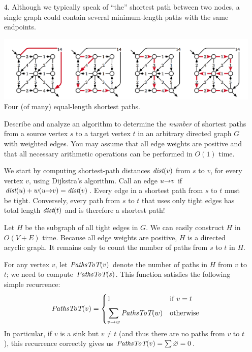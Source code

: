 \documentclass[11pt]{article}
\begin{document}
\begin{enumerate}
\Hard
\item[4.]
Although we typically speak of “the” shortest path between two nodes, a single graph could  contain several minimum-length paths with the same endpoints.  

\begin{center}\footnotesize\sffamily
\includegraphics[scale=0.4]{Fig/three-shortest-paths}\\
Four (of many) equal-length shortest paths.
\end{center}

Describe and analyze an algorithm to determine the \emph{number} of shortest paths from a source vertex $s$ to a target vertex $t$ in an arbitrary directed graph $G$ with weighted edges.  You may assume that all edge weights are positive and that all necessary arithmetic operations can be performed in $O(1)$ time.  



\begin{solution}
We start by computing shortest-path distances $\emph{dist}(v)$ from $s$ to $v$, for every vertex $v$, using Dijkstra’s algorithm.  Call an edge $u\mathord{\rightarrow} v$  if $\emph{dist}(u) + w(u\mathord{\rightarrow} v) = \emph{dist}(v)$.  Every edge in a shortest path from $s$ to $t$ must be tight.  Conversely, every path from $s$ to $t$ that uses only tight edges has total length $\emph{dist}(t)$ and is therefore a shortest path!

Let $H$ be the subgraph of all tight edges in $G$.  We can easily construct $H$ in $O(V+E)$ time.  Because all edge weights are positive, $H$ is a directed acyclic graph.  It remains only to count the number of paths from $s$ to $t$ in $H$.

For any vertex $v$, let $\emph{PathsToT}(v)$ denote the number of paths in $H$ from $v$ to $t$; we need to compute $\emph{PathsToT}(s)$.  This function satisfies the following simple recurrence:
\[
	\emph{PathsToT}(v) = 
	\begin{cases}
		1 & \text{if $v = t$}\\[0.5ex]
		\displaystyle \sum\limits_{v\mathord{\rightarrow} w}^{~} \emph{PathsToT}(w) & \text{otherwise}
	\end{cases}
\]
In particular, if $v$ is a sink but $v\ne t$ (and thus there are no paths from $v$ to $t$), this recurrence correctly gives us $\emph{PathsToT}(v) = \sum\varnothing = 0$.


\end{solution}
\end{enumerate}
\end{document}
